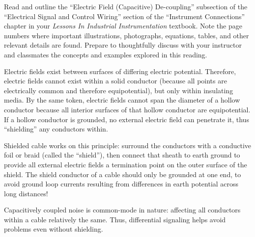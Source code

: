 

Read and outline the ``Electric Field (Capacitive) De-coupling'' subsection of the ``Electrical Signal and Control Wiring'' section of the ``Instrument Connections'' chapter in your {\it Lessons In Industrial Instrumentation} textbook.  Note the page numbers where important illustrations, photographs, equations, tables, and other relevant details are found.  Prepare to thoughtfully discuss with your instructor and classmates the concepts and examples explored in this reading.














Electric fields exist between surfaces of differing electric potential.  Therefore, electric fields cannot exist within a solid conductor (because all points are electrically common and therefore equipotential), but only within insulating media.  By the same token, electric fields cannot span the diameter of a hollow conductor because all interior surfaces of that hollow conductor are equipotential.  If a hollow conductor is grounded, no external electric field can penetrate it, thus ``shielding'' any conductors within.  

\vskip 10pt

Shielded cable works on this principle: surround the conductors with a conductive foil or braid (called the ``shield''), then connect that sheath to earth ground to provide all external electric fields a termination point on the outer surface of the shield.  The shield conductor of a cable should only be grounded at one end, to avoid ground loop currents resulting from differences in earth potential across long distances!

\vskip 10pt

Capacitively coupled noise is common-mode in nature: affecting all conductors within a cable relatively the same.  Thus, differential signaling helps avoid problems even without shielding.







